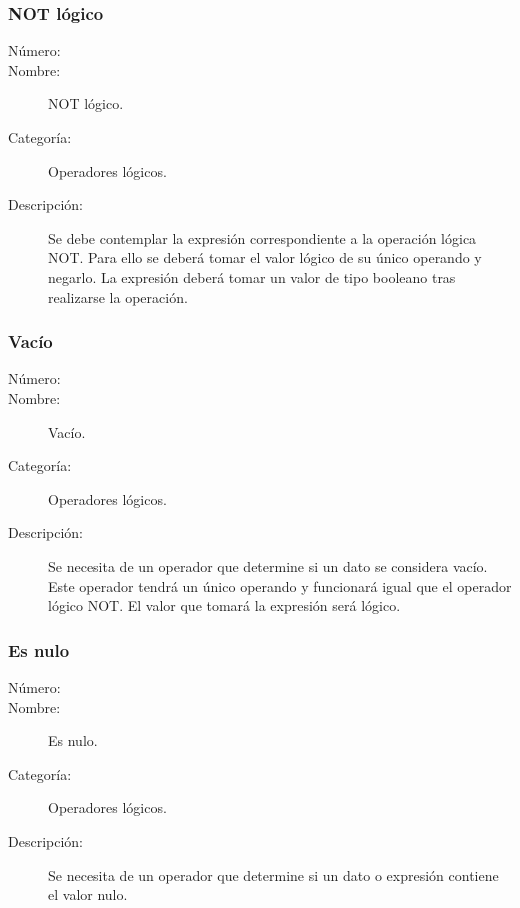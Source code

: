 \subsubsection{NOT lógico}
\begin{framed}
	\begin{description}
		\item [Número:] \cn
		\item [Nombre:] NOT lógico.
		\item [Categoría:] Operadores lógicos.
		\item [Descripción:] Se debe contemplar la expresión correspondiente a la operación lógica NOT. Para ello se deberá tomar
		el valor lógico de su único operando y negarlo. La expresión deberá tomar un valor de tipo booleano tras realizarse la operación.
	\end {description}
\end{framed}

\subsubsection{Vacío}
\begin{framed}
	\begin{description}
		\item [Número:] \cn
		\item [Nombre:] Vacío.
		\item [Categoría:] Operadores lógicos.
		\item [Descripción:] Se necesita de un operador que determine si un dato se considera vacío. Este operador tendrá un
		único operando y funcionará igual que el operador lógico NOT. El valor que tomará la expresión será lógico.
	\end {description}
\end{framed}

\subsubsection{Es nulo}
\begin{framed}
	\begin{description}
		\item [Número:] \cn
		\item [Nombre:] Es nulo.
		\item [Categoría:] Operadores lógicos.
		\item [Descripción:] Se necesita de un operador que determine si un dato o expresión contiene el valor nulo.
	\end {description}
\end{framed}

